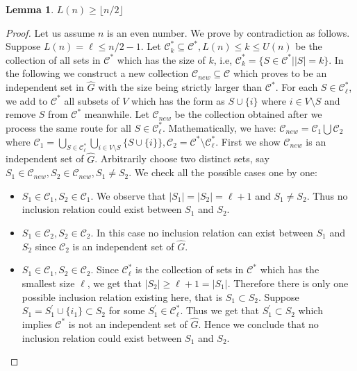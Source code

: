 \documentclass[11pt,letterpaper]{article}
\newtheorem{lemma}{Lemma}
\begin{document}
\begin{lemma}\label{lem:Lowe-n}
$L(n) \ge \lfloor n/2\rfloor$
\end{lemma}

\begin{proof}
Let us assume $n$ is an even number. We prove by contradiction as follows.
Suppose $L(n)=\ell \le n/2-1$. Let $\mathcal{C}^*_k \subseteq \mathcal{C}^*, L(n)\le k \le U(n)$ be
the collection of all sets in $\mathcal{C}^*$ which has the size of $k$, i.e,
$\mathcal{C}^*_k =\{S \in \mathcal{C}^*| |S|=k\}$. In the following we construct
a new collection $\mathcal{C}_{new} \subseteq \mathcal{C} $ which proves to be an
independent set in $\widehat{G}$ with the size being strictly larger than $\mathcal{C}^*$.
For each $S \in \mathcal{C}^*_\ell$, we add to $\mathcal{C}^*$ all subsets of $V$ which has the form
as $S\cup \{i\}$ where $i \in V \setminus S$ and remove $S$ from $\mathcal{C}^*$ meanwhile.
Let $\mathcal{C}_{new} $  be the collection obtained after we process the same route for all $S \in  \mathcal{C}^*_\ell$.
Mathematically, we have: $\mathcal{C}_{new}=  \mathcal{C}_1 \bigcup \mathcal{C}_2$ where 
$\mathcal{C}_1=\bigcup_{S\in \mathcal{C}^*_\ell } \bigcup_{i \in V \setminus S} \{ S\cup \{i\} \}, \mathcal{C}_2=\mathcal{C}^* \setminus \mathcal{C}^*_\ell$. 
First we show $\mathcal{C}_{new} $ is an independent set of $\widehat{G}$. Arbitrarily choose two distinct
sets, say $S_1 \in \mathcal{C}_{new}, S_2 \in \mathcal{C}_{new}, S_1 \ne S_2$.
We check all the possible cases one by one:
\begin{itemize}
  \item $S_1 \in \mathcal{C}_1, S_2 \in \mathcal{C}_1$. We observe that $|S_1|=|S_2|=\ell+1$ and $S_1 \ne S_2$. Thus
  no inclusion relation could exist between $S_1$ and $S_2$.
  \item $S_1 \in \mathcal{C}_2, S_2 \in \mathcal{C}_2$. In this case no inclusion relation can exist between $S_1$ and $S_2$
  since $\mathcal{C}_2$ is an independent set of $\widehat{G}$.
  \item $S_1 \in \mathcal{C}_1, S_2 \in \mathcal{C}_2$. Since $\mathcal{C}^*_\ell$ is the collection
  of sets in $\mathcal{C}^*$ which has the smallest size $\ell$, we get that $|S_2| \ge \ell+1=|S_1|$.
 Therefore there is only one possible inclusion relation existing here, that is $S_1 \subset S_2$. Suppose
 $S_1= S_1^\prime \cup \{i_1\} \subset S_2 $ for some $S_1^\prime \in \mathcal{C}^*_\ell$. Thus we get that
 $S_1^\prime  \subset S_2$ which implies  $\mathcal{C}^*$ is not an independent set of $\widehat{G}$. Hence
 we conclude that no inclusion relation could exist between $S_1$ and $S_2$.
\end{itemize}


\end{proof}
\end{document}
